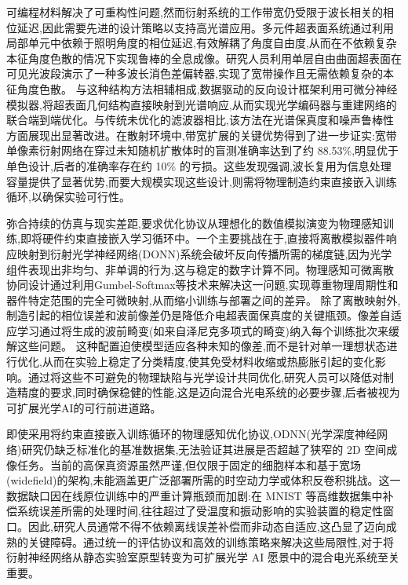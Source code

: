 可编程材料解决了可重构性问题,然而衍射系统的工作带宽仍受限于波长相关的相位延迟,因此需要先进的设计策略以支持高光谱应用。多元件超表面系统通过利用局部单元中依赖于照明角度的相位延迟,有效解耦了角度自由度,从而在不依赖复杂本征角度色散的情况下实现鲁棒的全息成像。研究人员利用单层自由曲面超表面在可见光波段演示了一种多波长消色差偏转器,实现了宽带操作且无需依赖复杂的本征角度色散。\citep{doi_10_1021_acs_nanolett_4c02995_4955c826} 与这种结构方法相辅相成,数据驱动的反向设计框架利用可微分神经模拟器,将超表面几何结构直接映射到光谱响应,从而实现光学编码器与重建网络的联合端到端优化。与传统未优化的滤波器相比,该方法在光谱保真度和噪声鲁棒性方面展现出显著改进。在散射环境中,带宽扩展的关键优势得到了进一步证实:宽带单像素衍射网络在穿过未知随机扩散体时的盲测准确率达到了约 88.53\%,明显优于单色设计,后者的准确率存在约 10\% 的亏损。这些发现强调,波长复用为信息处理容量提供了显著优势,而要大规模实现这些设计,则需将物理制造约束直接嵌入训练循环,以确保实验可行性。\citep{doi_10_2528_pier25052305_11655dbe} \citep{s2_76a83ea3baed75ad88b7f0782eb9a694a330c853_cee16cac} \citep{doi_10_1038_s41377_023_01116_3_aba67a18}

弥合持续的仿真与现实差距,要求优化协议从理想化的数值模拟演变为物理感知训练,即将硬件约束直接嵌入学习循环中。一个主要挑战在于,直接将离散模拟器件响应映射到衍射光学神经网络(DONN)系统会破坏反向传播所需的梯度链,因为光学组件表现出非均匀、非单调的行为,这与稳定的数字计算不同。物理感知可微离散协同设计通过利用Gumbel-Softmax等技术来解决这一问题,实现尊重物理周期性和器件特定范围的完全可微映射,从而缩小训练与部署之间的差异。\citep{doi_10_1145_3508352_3549378_13c53996} 除了离散映射外,制造引起的相位误差和波前像差仍是降低介电超表面保真度的关键瓶颈。像差自适应学习通过将生成的波前畸变(如来自泽尼克多项式的畸变)纳入每个训练批次来缓解这些问题。\citep{s2_8560e3428b029604da9bd494e485939165b3777e_bf7326ee} 这种配置迫使模型适应各种未知的像差,而不是针对单一理想状态进行优化,从而在实验上稳定了分类精度,使其免受材料收缩或热膨胀引起的变化影响。通过将这些不可避免的物理缺陷与光学设计共同优化,研究人员可以降低对制造精度的要求,同时确保稳健的性能,这是迈向混合光电系统的必要步骤,后者被视为可扩展光学AI的可行前进道路。\citep{doi_10_1145_3508352_3549378_13c53996} \citep{s2_8560e3428b029604da9bd494e485939165b3777e_bf7326ee} \citep{doi_10_1063_5_0141881_93942631}

即使采用将约束直接嵌入训练循环的物理感知优化协议,ODNN(光学深度神经网络)研究仍缺乏标准化的基准数据集,无法验证其进展是否超越了狭窄的 2D 空间成像任务。当前的高保真资源虽然严谨,但仅限于固定的细胞样本和基于宽场(widefield)的架构,未能涵盖更广泛部署所需的时空动力学或体积反卷积挑战。这一数据缺口因在线原位训练中的严重计算瓶颈而加剧:在 MNIST 等高维数据集中补偿系统误差所需的处理时间,往往超过了受温度和振动影响的实验装置的稳定性窗口。因此,研究人员通常不得不依赖离线误差补偿而非动态自适应,这凸显了迈向成熟的关键障碍。通过统一的评估协议和高效的训练策略来解决这些局限性,对于将衍射神经网络从静态实验室原型转变为可扩展光学 AI 愿景中的混合电光系统至关重要。\citep{doi_10_1038_s41597_026_07467_x_ae097478} \citep{s2_dac795899d5e98d409739c3bcfe096491d6b7427_5b5c8d05}

